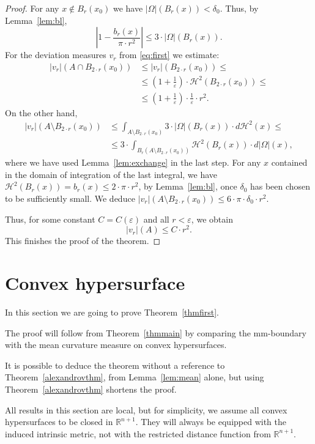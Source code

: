 \documentclass[12pt,leqno,intlimits]{amsart}
\numberwithin{equation}{section}
\theoremstyle{definition}
\theoremstyle{remark}
\newcommand{\tref}[1]{Theorem~\ref{#1}}
\newcommand{\lref}[1]{Lemma~\ref{#1}}
\newcommand{\R}{\mathbb{R}}
\begin{document}
\begin{proof}
For any $x\notin B_{r} (x_0)$ we have $| \Omega |(B_r (x)) < \delta _0$. Thus, by Lemma~\ref{lem:bl}, $$|1-\frac {b_r(x)} {\pi{\cdot}r^2} |
\leq
3\cdot |\Omega | ( B_{r} (x)).$$
For the deviation measures $v_r$ from \eqref{eq:first} we estimate:
\begin{align*}
|v_r| (A\cap B_{2{\cdot}r} (x_0))
&\leq |v_r| (B_{2{\cdot}r} (x_0)) \leq
\\
&\leq (1+ \tfrac 1 {\varepsilon}) \cdot \mathcal H^2 (B_{2{\cdot}r} (x_0)) \leq
\\
&\leq
(1+ \tfrac 1 {\varepsilon}) \cdot \tfrac 1 {\varepsilon} \cdot r^2.
\end{align*}
On the other hand,
\begin{align*}
|v_r| (A\setminus B_{2{\cdot}r} (x_0))
&\leq 
\int _{A \setminus B_{2{\cdot}r} (x_0) } 3 \cdot |\Omega| (B_r (x)) \cdot d\mathcal H^2 (x) 
\leq
\\
&\leq 3\cdot \int _{B_r (A\setminus B_{2{\cdot}r} (x_0))} \mathcal H^2 (B_r(x)) \cdot d|\Omega | (x),
\end{align*}
where we have used \lref{lem:exchange} in the last step.
For any $x$ contained in the domain of integration of the last integral, we have $\mathcal H^2 (B_r(x)) =b_r (x) \leq 2{\cdot}\pi{\cdot}r^2$, by \lref{lem:bl}, once $\delta _0$ has been chosen to be sufficiently small.
We deduce $|v_r| (A\setminus B_{2{\cdot}r} (x_0)) \leq 6 {\cdot}\pi {\cdot}\delta _0 {\cdot} r^2$.

Thus, for some constant $C=C(\varepsilon)$ and all $r<\varepsilon$, we obtain
$$|v_r|(A) \leq C\cdot r^2.$$
This finishes the proof of the theorem.
\end{proof}

\section{Convex hypersurface} \label{sec:hyper}
In this section we are going to prove \tref{thmfirst}.

The proof will follow from \tref{thmmain} by comparing the mm-boundary with the mean curvature measure on convex hypersurfaces.

It is possible to deduce the theorem without a reference to \tref{alexandrovthm}, from \lref{lem:mean} alone, but using \tref{alexandrovthm} shortens the proof.

All results in this section are local,
but for simplicity, we assume all convex hypersurfaces to be closed in $\R^{n+1}$.
They will always be equipped with the induced intrinsic metric, not with the restricted distance function from $\mathbb R^{n+1}$.
\end{document}
